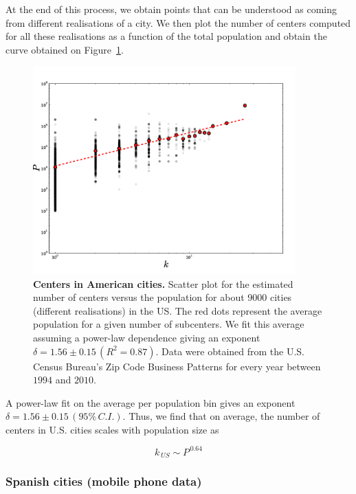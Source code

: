 At the end of this process, we obtain points that can be understood as coming
from different realisations of a city. We then plot the number of centers
computed for all these realisations as a function of the total population and
obtain the curve obtained on Figure~\ref{fig:us_centers}.

\begin{figure}
    \centering
    \includegraphics[width=0.9\textwidth]{gfx/chapter-monocentric/5.png}
    \caption{{\bf Centers in American cities.} Scatter plot for the estimated number of centers versus the
    population for about 9000 cities (different realisations) in the US. The red
dots represent the average population for a given number of subcenters. We fit
this average assuming a power-law dependence giving an exponent $\delta = 1.56
    \pm 0.15\,(R^2=0.87)$. Data were obtained from the U.S. Census Bureau's Zip
Code Business Patterns for every year between $1994$ and $2010$. \label{fig:us_centers}}
\end{figure}


A power-law fit on the average per population bin gives an exponent $\delta =
1.56 \pm 0.15\,(95\%\,C.I.)$. Thus, we find that on average, the number of
centers in U.S. cities scales with population size as

\begin{equation}
    k_{\,US} \sim P^{\,0.64}
\end{equation}

\subsubsection{Spanish cities (mobile phone data)}
\label{sub:spanish_cities_mobile_phone_data_}

